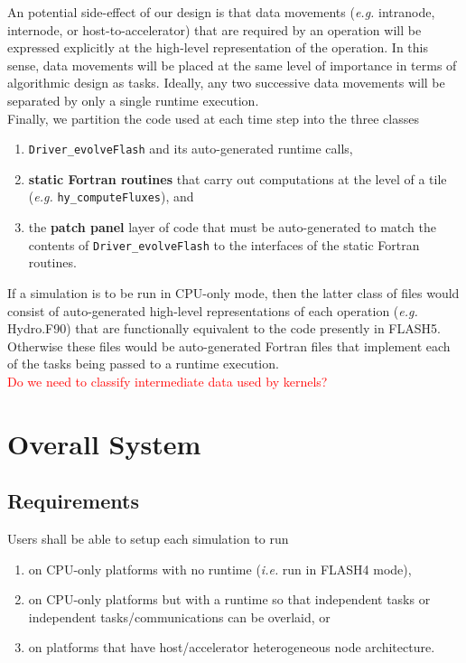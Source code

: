 \documentclass{article}
\begin{document}
An potential side-effect of our design is that data movements (\textit{e.g.}
intranode, internode, or host-to-accelerator) that are required by an operation
will be expressed explicitly at the high-level representation of the operation.
In this sense, data movements will be placed at the same level of importance in
terms of algorithmic design as tasks.  Ideally, any two successive data
movements will be separated by only a single runtime execution.\\

Finally, we partition the code used at each time step into the three classes
\begin{enumerate}
\item{\texttt{Driver\_evolveFlash} and its auto-generated runtime calls,}
\item{\textbf{static Fortran routines} that carry out computations at the
level of a tile (\textit{e.g.} \texttt{hy\_computeFluxes}), and}
\item{the \textbf{patch panel} layer of code that must be auto-generated to
match the contents of \texttt{Driver\_evolveFlash} to the interfaces of the
static Fortran routines.}
\end{enumerate}
If a simulation is to be run in CPU-only mode, then the latter class of files
would consist of auto-generated high-level representations of each operation
(\textit{e.g.} Hydro.F90) that are functionally equivalent to the code presently
in FLASH5.  Otherwise these files would be auto-generated Fortran files that
implement each of the tasks being passed to a runtime execution.\\

\textcolor{red}{Do we need to classify intermediate data used by kernels?}

\section{Overall System}
\subsection{Requirements}
Users shall be able to setup each simulation to run
\begin{enumerate}
\item{on CPU-only platforms with no runtime (\textit{i.e.} run in FLASH4 mode),}
\item{on CPU-only platforms but with a runtime so that independent tasks or
independent tasks/communications can be overlaid, or}
\item{on platforms that have host/accelerator heterogeneous node architecture.}
\end{enumerate}
\end{document}
